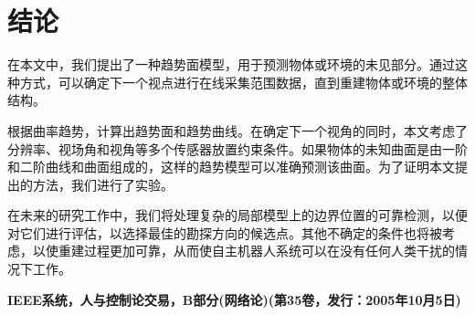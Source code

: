 \documentclass[AutoFakeBold,zihao=-4]{ctexart}
\begin{document}
	\section{结论}
	在本文中，我们提出了一种趋势面模型，用于预测物体或环境的未见部分。通过这种方式，可以确定下一个视点进行在线采集范围数据，直到重建物体或环境的整体结构。
	
	根据曲率趋势，计算出趋势面和趋势曲线。在确定下一个视角的同时，本文考虑了分辨率、视场角和视角等多个传感器放置约束条件。如果物体的未知曲面是由一阶和二阶曲线和曲面组成的，这样的趋势模型可以准确预测该曲面。为了证明本文提出的方法，我们进行了实验。
	
	在未来的研究工作中，我们将处理复杂的局部模型上的边界位置的可靠检测，以便对它们进行评估，以选择最佳的勘探方向的候选点。其他不确定的条件也将被考虑，以使重建过程更加可靠，从而使自主机器人系统可以在没有任何人类干扰的情况下工作。
	
	\nocite{*}
	
	
	\begin{flushright}
		\songti {} \bfseries IEEE系统，人与控制论交易，B部分(网络论)(第35卷，发行：2005年10月5日)
	\end{flushright}
\end{document}
